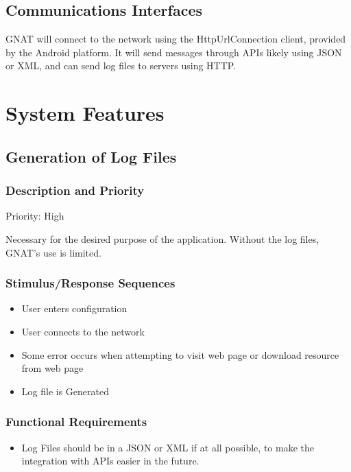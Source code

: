\documentclass{scrreprt}
\begin{document}
\section{Communications Interfaces}

GNAT will connect to the network using the HttpUrlConnection client, provided by the Android platform. It will send messages through APIs likely using JSON or XML, and can send log files to servers using HTTP\@.

\chapter{System Features}

\section{Generation of Log Files}

\subsection{Description and Priority}

Priority: High

Necessary for the desired purpose of the application.  Without the log files, GNAT's use is limited.

\subsection{Stimulus/Response Sequences}
\begin{itemize}
  \item User enters configuration
  \item User connects to the network
  \item Some error occurs when attempting to visit web page or download resource from web page
  \item Log file is Generated
\end{itemize}

\subsection{Functional Requirements}

\begin{itemize}
  \item Log Files should be in a JSON or XML if at all possible, to make the integration with APIs easier in the future.
\end{itemize}
\end{document}
